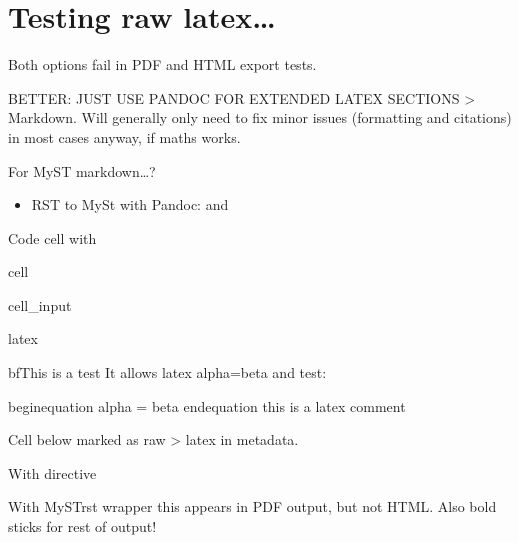 \documentclass[letterpaper,10pt,english]{jupyterBook}
\begin{document}
\section{Testing raw latex…}
\label{\detokenize{tests/formatting_syntax_tests_081122:testing-raw-latex}}
\sphinxAtStartPar
Both options fail in PDF and HTML export tests.

\sphinxAtStartPar
BETTER: JUST USE PANDOC FOR EXTENDED LATEX SECTIONS > Markdown. Will generally only need to fix minor issues (formatting and citations) in most cases anyway, if maths works.

\sphinxAtStartPar
For MyST markdown…?
\begin{itemize}
\item {} 
\sphinxAtStartPar
RST to MySt with Pandoc:  and 

\end{itemize}

\sphinxAtStartPar
Code cell with 

\begin{sphinxuseclass}{cell}\begin{sphinxVerbatimInput}

\begin{sphinxuseclass}{cell_input}
\begin{sphinxVerbatim}[commandchars=\\\{\}]
\PYGZpc{}\PYGZpc{}latex

\PYGZbs{}bf\PYGZob{}This is a test\PYGZcb{} \PYGZbs{}\PYGZbs{}
It allows latex \PYGZdl{}\PYGZbs{}alpha=\PYGZbs{}beta\PYGZdl{} and test:

\PYGZbs{}begin\PYGZob{}equation\PYGZcb{}
\PYGZbs{}alpha = \PYGZbs{}beta
\PYGZbs{}end\PYGZob{}equation\PYGZcb{}
\PYGZpc{} this is a latex comment
\end{sphinxVerbatim}

\end{sphinxuseclass}\end{sphinxVerbatimInput}

\end{sphinxuseclass}
\sphinxAtStartPar
Cell below marked as raw > latex in metadata.

\sphinxAtStartPar
With  directive

\sphinxAtStartPar
With MyST\sphinxhyphen{}rst wrapper \sphinxhyphen{} this appears in PDF output, but not HTML. Also bold sticks for rest of output!
\end{document}
